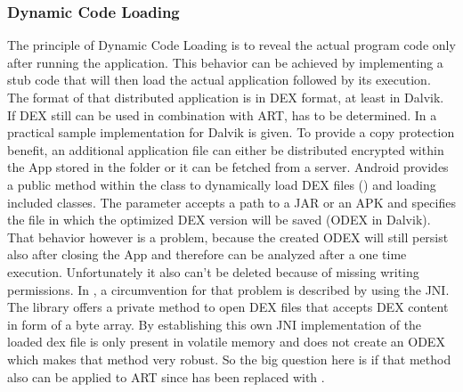 \subsubsection{Dynamic Code Loading}\label{section:dynamic_code_loading}
The principle of Dynamic Code Loading is to reveal the actual program code
only after running the application. This behavior can be achieved by
implementing a stub code that will then load the actual application
followed by its execution. The format of that distributed application is
in DEX format, at least in Dalvik. If DEX still can be used
in combination with ART, has to be determined.
In \parencite{dexfileclass} a practical
sample implementation for Dalvik is given.
To provide a copy protection benefit, an additional application file can either be distributed encrypted within the App stored in the  folder or it can be fetched from a server.
Android provides a public method within
the  class to dynamically load DEX files
()
and loading included classes. The  parameter accepts
a path to a JAR or an APK and  specifies
the file in which the optimized DEX version will be saved (ODEX in Dalvik).
That behavior however is a problem, because the created ODEX will still persist
also after closing the App and therefore can be analyzed after a one time
execution. Unfortunately it also can't be deleted because of missing writing permissions. In \parencite{code_protection},
a circumvention for that problem is described by using the JNI.
The  library offers a private method to open DEX files
that accepts DEX content in form of a byte array.
By establishing this own JNI implementation of
 the loaded dex file is only present
in volatile memory and does not create an ODEX \parencite{code_protection}
which makes that method very robust. So the big question here is if
that method also can be applied to ART since  has been replaced
with .

